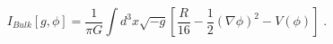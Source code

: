\begin{equation}
I_{Bulk}[g,\phi ]=\frac{1}{\pi G}\int d^{3}x\sqrt{-g}\left[ \frac{R}{16}-%
\frac{1}{2}(\nabla \phi )^{2}-V(\phi )\right] \;.  \label{Action Bulk}
\end{equation}


